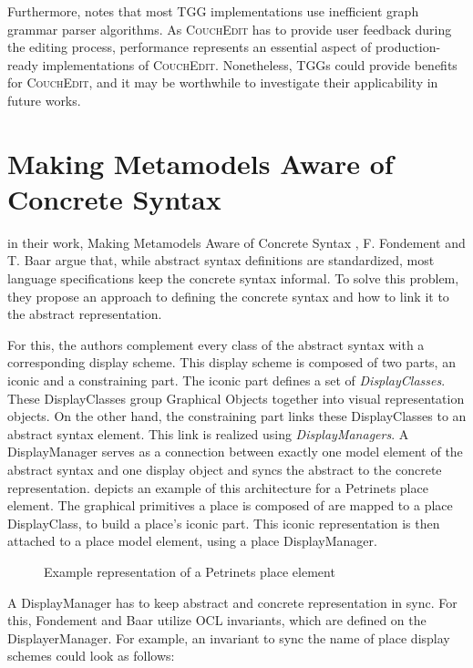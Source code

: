 Furthermore, \cite{schurr_15_2008} notes that most TGG implementations use inefficient graph grammar parser algorithms. As \textsc{CouchEdit} has to provide user feedback during the editing process, performance represents an essential aspect of production-ready implementations of \textsc{CouchEdit}. Nonetheless, TGGs could provide benefits for \textsc{CouchEdit}, and it may be worthwhile to investigate their applicability in future works. 



\section{Making Metamodels Aware of Concrete Syntax}
\label{sec:fondement}
in their work, Making Metamodels Aware of Concrete Syntax \cite{fondement_making_2005}, F. Fondement and T. Baar argue that, while abstract syntax definitions are standardized, most language specifications keep the concrete syntax informal. To solve this problem, they propose an approach to defining the concrete syntax and how to link it to the abstract representation.

For this, the authors complement every class of the abstract syntax with a corresponding display scheme. This display scheme is composed of two parts, an iconic and a constraining part. The iconic part defines a set of \emph{DisplayClasses}. These DisplayClasses group Graphical Objects together into visual representation objects. On the other hand, the constraining part links these DisplayClasses to an abstract syntax element. This link is realized using \emph{DisplayManagers}. A DisplayManager serves as a connection between exactly one model element of the abstract syntax and one display object and syncs the abstract to the concrete representation.  depicts an example of this architecture for a Petrinets place element. The graphical primitives a place is composed of are mapped to a place DisplayClass, to build a place's iconic part. This iconic representation is then attached to a place model element, using a place DisplayManager.


\begin{figure}[H]
  \centering
  
  \caption{Example representation of a Petrinets place element}
  \label{fig:fondement_dm}
\end{figure}

A DisplayManager has to keep abstract and concrete representation in sync. For this, Fondement and Baar utilize OCL invariants, which are defined on the DisplayerManager. For example, an invariant to sync the name of place display schemes could look as follows:

